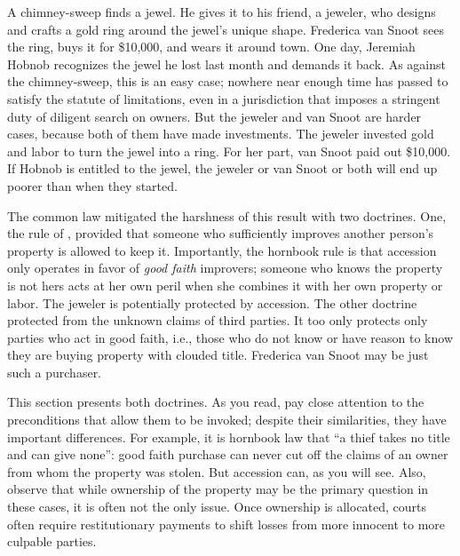 A chimney-sweep finds a jewel. He gives it to his friend, a jeweler, who designs
and crafts a gold ring around the jewel's unique shape. Frederica van Snoot
sees the ring, buys it for \$10,000, and wears it around town. One day,
Jeremiah Hobnob recognizes the jewel he lost last month and demands it back. As
against the chimney-sweep, this is an easy case; nowhere near enough time has
passed to satisfy the statute of limitations, even in a jurisdiction that
imposes a stringent duty of diligent search on owners. But the jeweler and van
Snoot are harder cases, because both of them have made investments. The jeweler
invested gold and labor to turn the jewel into a ring. For her part, van Snoot
paid out \$10,000. If Hobnob is entitled to the jewel, the jeweler or van Snoot
or both will end up poorer than when they started.

The common law mitigated the harshness of this result with two doctrines. One,
the rule of , provided that someone who sufficiently improves
another person's property is allowed to keep it. Importantly, the hornbook rule
is that accession only operates in favor of \textit{good faith} improvers;
someone who knows the property is not hers acts at her own peril when she
combines it with her own property or labor. The jeweler is potentially
protected by accession. The other doctrine protected  from the unknown claims of third parties. It too only
protects only parties who act in good faith, i.e., those who do not know or
have reason to know they are buying property with clouded title. Frederica van
Snoot may be just such a purchaser. 

This section presents both doctrines. As you read, pay close attention to the
preconditions that allow them to be invoked; despite their similarities, they
have important differences. For example, it is hornbook law that ``a thief
takes no title and can give none'': good faith purchase can never cut off the
claims of an owner from whom the property was stolen. But accession can, as you
will see. Also, observe that while ownership of the property may be the primary
question in these cases, it is often not the only issue. Once ownership is
allocated, courts often require restitutionary payments to shift losses from
more innocent to more culpable parties. 

